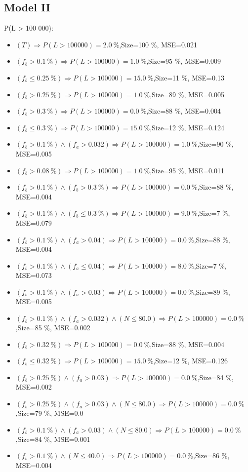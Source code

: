 \documentclass[numbered]{CSL}
\begin{document}
\subsection{Model II}
P(L > 100 000):
\begin{itemize}
\item $(T) \Rightarrow P(L > 100 000) = 2.0~\%$,\hfill Size=100 \%, MSE=0.021
\item $(f_b > 0.1~\%) \Rightarrow P(L > 100 000) = 1.0~\%$,\hfill Size=95 \%, MSE=0.009
\item $(f_b \leq 0.25~\%) \Rightarrow P(L > 100 000) = 15.0~\%$,\hfill Size=11 \%, MSE=0.13
\item $(f_b > 0.25~\%) \Rightarrow P(L > 100 000) = 1.0~\%$,\hfill Size=89 \%, MSE=0.005
\item $(f_b > 0.3~\%) \Rightarrow P(L > 100 000) = 0.0~\%$,\hfill Size=88 \%, MSE=0.004
\item $(f_b \leq 0.3~\%) \Rightarrow P(L > 100 000) = 15.0~\%$,\hfill Size=12 \%, MSE=0.124
\item $(f_b > 0.1~\%) \land (f_a > 0.032) \Rightarrow P(L > 100 000) = 1.0~\%$,\hfill Size=90 \%, MSE=0.005
\item $(f_b > 0.08~\%) \Rightarrow P(L > 100 000) = 1.0~\%$,\hfill Size=95 \%, MSE=0.011
\item $(f_b > 0.1~\%) \land (f_b > 0.3~\%) \Rightarrow P(L > 100 000) = 0.0~\%$,\hfill Size=88 \%, MSE=0.004
\item $(f_b > 0.1~\%) \land (f_b \leq 0.3~\%) \Rightarrow P(L > 100 000) = 9.0~\%$,\hfill Size=7 \%, MSE=0.079
\item $(f_b > 0.1~\%) \land (f_a > 0.04) \Rightarrow P(L > 100 000) = 0.0~\%$,\hfill Size=88 \%, MSE=0.004
\item $(f_b > 0.1~\%) \land (f_a \leq 0.04) \Rightarrow P(L > 100 000) = 8.0~\%$,\hfill Size=7 \%, MSE=0.073
\item $(f_b > 0.1~\%) \land (f_a > 0.03) \Rightarrow P(L > 100 000) = 0.0~\%$,\hfill Size=89 \%, MSE=0.005
\item $(f_b > 0.1~\%) \land (f_a > 0.032) \land (N \leq 80.0) \Rightarrow P(L > 100 000) = 0.0~\%$,\hfill Size=85 \%, MSE=0.002
\item $(f_b > 0.32~\%) \Rightarrow P(L > 100 000) = 0.0~\%$,\hfill Size=88 \%, MSE=0.004
\item $(f_b \leq 0.32~\%) \Rightarrow P(L > 100 000) = 15.0~\%$,\hfill Size=12 \%, MSE=0.126
\item $(f_b > 0.25~\%) \land (f_a > 0.03) \Rightarrow P(L > 100 000) = 0.0~\%$,\hfill Size=84 \%, MSE=0.002
\item $(f_b > 0.25~\%) \land (f_a > 0.03) \land (N \leq 80.0) \Rightarrow P(L > 100 000) = 0.0~\%$,\hfill Size=79 \%, MSE=0.0
\item $(f_b > 0.1~\%) \land (f_a > 0.03) \land (N \leq 80.0) \Rightarrow P(L > 100 000) = 0.0~\%$,\hfill Size=84 \%, MSE=0.001
\item $(f_b > 0.1~\%) \land (N \leq 40.0) \Rightarrow P(L > 100 000) = 0.0~\%$,\hfill Size=86 \%, MSE=0.004
\end{itemize}
\end{document}
